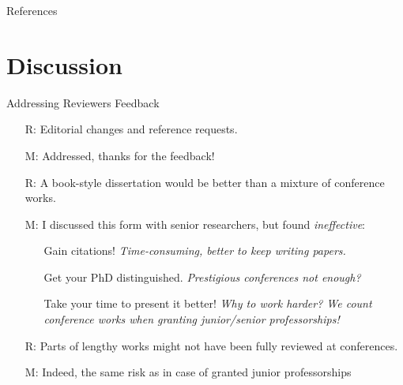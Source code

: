 \documentclass[10pt]{beamer}					%
\begin{document}
\begin{frame}[allowframebreaks]{References}
	\tiny
	
\end{frame}

\section{Discussion }

\begin{frame}{Addressing Reviewers Feedback}
\begin{itemize}
    \item[R:] Editorial changes and reference requests.
    \item[M:] Addressed, thanks for the feedback!
    \item[R:] A book-style dissertation would be better than a mixture of conference works.
    \item[M:] I discussed this form with senior researchers, but found \emph{ineffective}:
    \begin{itemize}
        \item[\emoji{carrot}] Gain citations! \emph{Time-consuming, better to keep writing papers.}
        \item[\emoji{carrot}] Get your PhD distinguished. \emph{Prestigious conferences not enough?}
        \item[\emoji{sweat-droplets}] Take your time to present it better! \emph{Why to work harder? We count conference works when granting junior/senior  professorships!} 
    \end{itemize}
    \item[R:] Parts of lengthy works might not have been fully reviewed at conferences.
    \item[M:] Indeed, the same risk as in case of granted junior professorships 
\end{itemize}
\end{frame}
\end{document}
